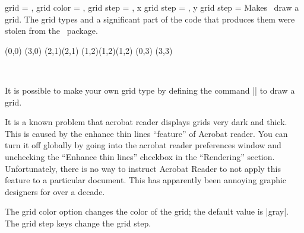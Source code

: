\begin{sseqdata}[name = basic, cohomological Serre grading]
\begin{keylist}{
    grid = ,
    grid color = ,
    grid step = ,
    x grid step = ,
    y grid step = 
}%
Makes \sseqpages\  draw a grid. The grid types and a significant part of the
code that produces them were stolen from the \sseqpkg\ package.
\begin{codeexample}[vbox]
\begin{sseqdata}[ name = grid example, scale = 0.8 ]
\class(0,0)
\class(3,0)
\class(2,1)\class(2,1)
\class(1,2)\class(1,2)\class(1,2)
\class(0,3)
\class(3,3)
\end{sseqdata}
\hbox{
\printpage[ name = grid example, grid = chess, title=chess ]
\qquad
\printpage[ name = grid example, grid = crossword, title=crossword ]
}
\vskip20pt
\hbox{
\printpage[ name = grid example, grid = go, title=go ]
\qquad
\printpage[ name = grid example, grid = none ]
}
\end{codeexample}
It is possible to make your own grid type by defining the command
|\sseq@grid@yourgridname| to draw a grid.

It is a known problem that acrobat reader displays grids very dark and thick.
This is caused by the enhance thin lines ``feature'' of Acrobat reader. You can
turn it off globally by going into the acrobat reader preferences window and
unchecking the ``Enhance thin lines'' checkbox in the ``Rendering'' section.
Unfortunately, there is no way to instruct Acrobat Reader to not apply this
feature to a particular document. This has apparently been annoying graphic
designers for over a decade.

The grid color option changes the color of the grid; the default value is |gray|.
The grid step keys change the grid step.
\end{keylist}


\end{sseqdata}
